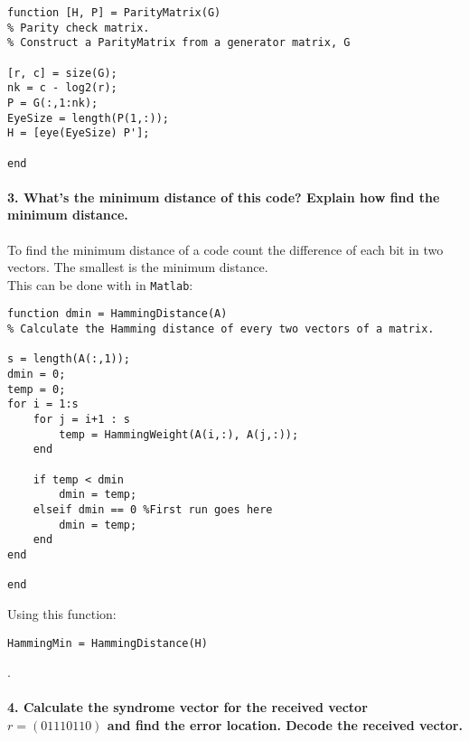 \documentclass[Main]{subfiles}
\begin{document}
\begin{lstlisting}[caption=ParityMatrix, style=Code-Matlab, label=lst:Parity]
function [H, P] = ParityMatrix(G)
% Parity check matrix.
% Construct a ParityMatrix from a generator matrix, G

[r, c] = size(G);
nk = c - log2(r);
P = G(:,1:nk);
EyeSize = length(P(1,:));
H = [eye(EyeSize) P'];

end
\end{lstlisting}



\paragraph{3. What's the minimum distance of this code? Explain how find the
minimum distance.}
To find the minimum distance of a code count the difference of each bit in two vectors.
The smallest is the minimum distance.
\\
This can be done with in \texttt{Matlab}:

\begin{lstlisting}[caption=Minimum Hamming distance, style=Code-Matlab, label=lst:dmin]
function dmin = HammingDistance(A)
% Calculate the Hamming distance of every two vectors of a matrix.

s = length(A(:,1));
dmin = 0;
temp = 0;
for i = 1:s
    for j = i+1 : s
        temp = HammingWeight(A(i,:), A(j,:));
    end
    
    if temp < dmin
        dmin = temp;
    elseif dmin == 0 %First run goes here
        dmin = temp;
    end
end

end
\end{lstlisting}
Using this function:

\begin{lstlisting}[caption=Calculate the minimum distance, style=Code-Matlab, label=lst:]
HammingMin = HammingDistance(H)
\end{lstlisting}
.



\paragraph{4. Calculate the syndrome vector for the received vector $r = (01110110)$ and find the error location. Decode the received vector.}
\end{document}
